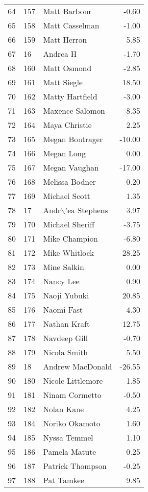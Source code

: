 \begin{table}[ht]
\begin{tabular}{rllr}
  64 & 157 & Matt Barbour & -0.60 \\ 
  65 & 158 & Matt Casselman & -1.00 \\ 
  66 & 159 & Matt Herron & 5.85 \\ 
  67 & 16 & Andrea H & -1.70 \\ 
  68 & 160 & Matt Osmond & -2.85 \\ 
  69 & 161 & Matt Siegle & 18.50 \\ 
  70 & 162 & Matty Hartfield & -3.00 \\ 
  71 & 163 & Maxence Salomon & 8.35 \\ 
  72 & 164 & Maya Christie & 2.25 \\ 
  73 & 165 & Megan Bontrager & -10.00 \\ 
  74 & 166 & Megan Long & 0.00 \\ 
  75 & 167 & Megan Vaughan & -17.00 \\ 
  76 & 168 & Melissa Bodner & 0.20 \\ 
  77 & 169 & Michael Scott & 1.35 \\ 
  78 & 17 & Andr$\backslash$'ea Stephens & 3.97 \\ 
  79 & 170 & Michael Sheriff & -3.75 \\ 
  80 & 171 & Mike Champion & -6.80 \\ 
  81 & 172 & Mike Whitlock & 28.25 \\ 
  82 & 173 & Mine Salkin & 0.00 \\ 
  83 & 174 & Nancy Lee & 0.90 \\ 
  84 & 175 & Naoji Yubuki & 20.85 \\ 
  85 & 176 & Naomi Fast & 4.30 \\ 
  86 & 177 & Nathan Kraft & 12.75 \\ 
  87 & 178 & Navdeep Gill & -0.70 \\ 
  88 & 179 & Nicola Smith & 5.50 \\ 
  89 & 18 & Andrew MacDonald & -26.55 \\ 
  90 & 180 & Nicole Littlemore & 1.85 \\ 
  91 & 181 & Ninam Cormetto & -0.50 \\ 
  92 & 182 & Nolan Kane & 4.25 \\ 
  93 & 184 & Noriko Okamoto & 1.60 \\ 
  94 & 185 & Nyssa Temmel & 1.10 \\ 
  95 & 186 & Pamela Matute & 0.25 \\ 
  96 & 187 & Patrick Thompson & -0.25 \\ 
  97 & 188 & Pat Tamkee & 9.85 \\ 

\end{tabular}
\end{table}
